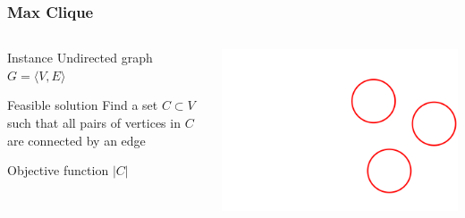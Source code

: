 \documentclass[12pt,aspectratio=169]{beamer}
\begin{document}
\begin{frame}\frametitle{Max Clique }
\begin{columns} 
  \begin{column}{0.48\textwidth}
  \begin{block}{Instance}
    Undirected graph $G=\langle V,E \rangle$
  \end{block}
  \begin{block}{Feasible solution}
    Find a set $C\subset V$ such that all pairs of vertices in $C$ are connected by an edge
  \end{block}
    \begin{block}{Objective function}
      $|C|$
    \end{block}
  \end{column}
    
    \begin{column}{0.48\textwidth}
      \centering

  \includegraphics[height=0.5\textheight]{img/6n-graf-clique}
\end{column}
\end{columns}
\end{frame}
\end{document}
